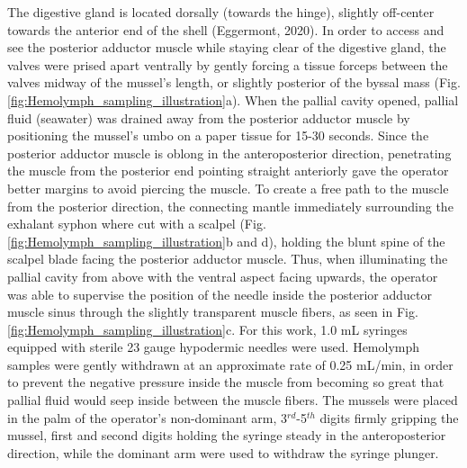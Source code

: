 The digestive gland is located dorsally (towards the hinge), slightly off-center towards the anterior end of the shell (Eggermont, 2020). In order to access and see the posterior adductor muscle while staying clear of the digestive gland, the valves were prised apart ventrally by gently forcing a tissue forceps between the valves midway of the mussel's length, or slightly posterior of the byssal mass (Fig. \ref{fig:Hemolymph_sampling_illustration}a). When the pallial cavity opened, pallial fluid (seawater) was drained away from the posterior adductor muscle by positioning the mussel's umbo on a paper tissue for 15-30 seconds. Since the posterior adductor muscle is oblong in the anteroposterior direction, penetrating the muscle from the posterior end pointing straight anteriorly gave the operator better margins to avoid piercing the muscle. To create a free path to the muscle from the posterior direction, the connecting mantle immediately surrounding the exhalant syphon where cut with a scalpel (Fig. \ref{fig:Hemolymph_sampling_illustration}b and d), holding the blunt spine of the scalpel blade facing the posterior adductor muscle. Thus, when illuminating the pallial cavity from above with the ventral aspect facing upwards, the operator was able to supervise the position of the needle inside the posterior adductor muscle sinus through the slightly transparent muscle fibers, as seen in Fig. \ref{fig:Hemolymph_sampling_illustration}c. For this work, 1.0 mL syringes equipped with sterile 23 gauge hypodermic needles were used. Hemolymph samples were gently withdrawn at an approximate rate of 0.25 mL/min, in order to prevent the negative pressure inside the muscle from becoming so great that pallial fluid would seep inside between the muscle fibers. The mussels were placed in the palm of the operator's non-dominant arm, 3$^{rd}$-5$^{th}$ digits firmly gripping the mussel, first and second digits holding the syringe steady in the anteroposterior direction, while the dominant arm were used to withdraw the syringe plunger.

